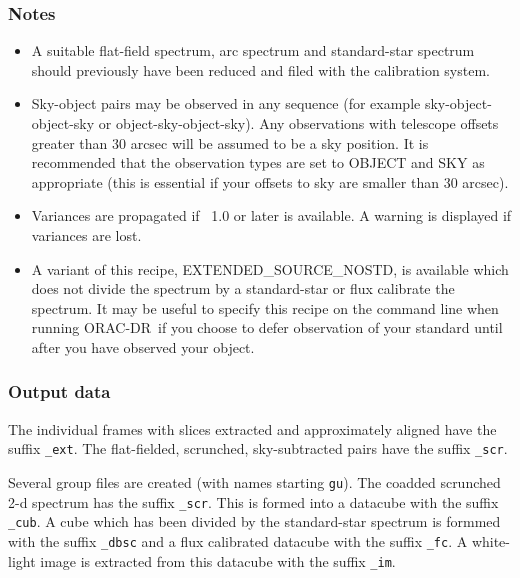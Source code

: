 \documentclass[twoside,11pt,nolof]{starlink}
\providecommand{\KAPPA}{\xref{{\sc{Kappa}}}{sun95}{}}
\providecommand{\ORACDR}{{\footnotesize ORAC-DR}}
\begin{document}
\subsubsection*{Notes}\begin{itemize}
\item

A suitable flat-field spectrum, arc spectrum and standard-star
spectrum should previously have been reduced and filed with the
calibration system.

\item

  Sky-object pairs may be observed in any sequence (for example
  sky-object-object-sky or object-sky-object-sky). Any observations
  with telescope offsets greater than 30 arcsec will be assumed to be
  a sky position. It is recommended that the observation types are set
  to OBJECT and SKY as appropriate (this is essential if your offsets
  to sky are smaller than 30 arcsec).

\item

Variances are propagated if \KAPPA\ 1.0 or later is available. A warning
is displayed if variances are lost.

\item

A variant of this recipe, EXTENDED\_SOURCE\_NOSTD, is
available which does not divide the spectrum by a standard-star or
flux calibrate the spectrum. It may be useful to specify this recipe
on the command line when running \ORACDR\ if you choose to defer
observation of your standard until after you have observed your
object.

\end{itemize}

\subsubsection*{Output data}

The individual frames with slices extracted and approximately aligned
have the suffix \texttt{\_ext}. The flat-fielded, scrunched,
sky-subtracted pairs have the suffix \texttt{\_scr}.

Several group files are created (with names starting \texttt{gu}). The
coadded scrunched 2-d spectrum has the suffix \texttt{\_scr}. This is
formed into a datacube with the suffix \texttt{\_cub}. A cube which has
been divided by the standard-star spectrum is formmed with the suffix
\texttt{\_dbsc} and a flux calibrated datacube with the suffix \texttt{\_fc}.  A white-light image is extracted from this datacube with the
suffix \texttt{\_im}.
\end{document}
